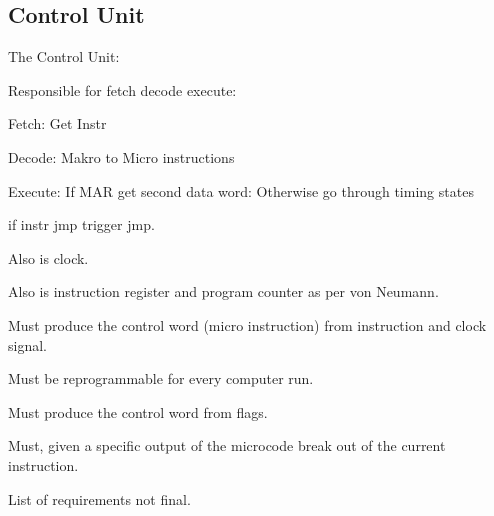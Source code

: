 \subsection{Control Unit}

The Control Unit:

Responsible for fetch decode execute:  

Fetch: Get Instr

Decode: Makro to Micro instructions

Execute: If MAR get second data word: 
Otherwise go through timing states

if instr jmp trigger jmp. 

Also is clock. 

Also is instruction register and program counter as per von Neumann.



\begin{arch-requirement}
  Must produce the control word (micro instruction) from instruction and clock signal.
\end{arch-requirement}

\begin{arch-requirement}
  Must be reprogrammable for every computer run.
\end{arch-requirement}

\begin{turing-requirement}
  Must produce the control word from flags.
\end{turing-requirement}

\begin{feat-requirement}
  Must, given a specific output of the microcode break out of the current instruction. 
\end{feat-requirement}

List of requirements not final.


